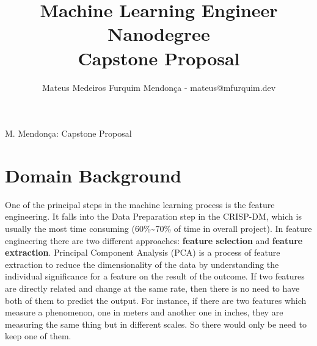 \documentclass[10pt,twoside,twocolumn,nofonttune,a4paper,journal,compsoc,english,french,spanish]{IEEEtran}
\begin{document}



\title{\textbf{Machine Learning Engineer Nanodegree}\\
        Capstone Proposal}

\author{Mateus Medeiros Furquim Mendonça - mateus@mfurquim.dev}

{M. Mendonça: Capstone Proposal}



\maketitle

\IEEEdisplaynontitleabstractindextext

\hypertarget{domain-background}{%
\section{Domain Background}\label{domain-background}}

One of the principal steps in the machine learning process is the
feature engineering. It falls into the Data Preparation step in the
CRISP-DM, which is usually the most time consuming
(60\%\textasciitilde70\% of time in overall
project)\cite{sarkar2017practical}. In feature engineering there are two
different approaches: \textbf{feature selection} and \textbf{feature
extraction}. Principal Component Analysis (PCA) is a process of feature
extraction to reduce the dimensionality of the data by understanding the
individual significance for a feature on the result of the
outcome\cite{shlens2014tutorial}. If two features are directly related
and change at the same rate, then there is no need to have both of them
to predict the output. For instance, if there are two features which
measure a phenomenon, one in meters and another one in inches, they are
measuring the same thing but in different scales. So there would only be
need to keep one of them.
\end{document}
